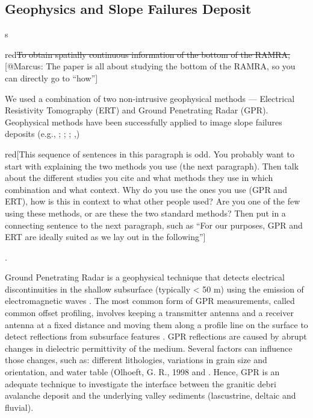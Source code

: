 \documentclass[utf8]{frontiersSCNS}
\newcommand{\alon}{\begin{color}{red}}
\newcommand{\aloff}{\end{color}}
\begin{document}



                 
                 
\subsection{Geophysics and Slope Failures Deposit}s

\alon\sout{To obtain spatially continuous information of the bottom of
  the RAMRA,} [@Marcus: The paper is all about studying the bottom of
  the RAMRA, so you can directly go to ``how''] \aloff We used a
combination of two non-intrusive geophysical methods --- Electrical
Resistivity Tomography (ERT) and Ground Penetrating Radar
(GPR). Geophysical methods have been successfully applied to image
slope failures deposits (e.g., \cite{sass2006determination};
\cite{otto2006comparing}; \cite{socco2010geophysical};
\cite{brody2015near},\cite{liu2018near}) \alon [This sequence of
  sentences in this paragraph is odd. You probably want to start with
  explaining the two methods you use (the next paragraph). Then talk about
  the different studies you cite and what methods they use in which
  combination and what context. Why do you use the ones you use (GPR and ERT), how is this in
  context to what other people used? Are you one of the few using
  these methods, or are these the two standard methods? Then put in a
  connecting sentence to the next paragraph, such as ``For our
  purposes, GPR and ERT are ideally suited as we lay out in the
  following''] \aloff.
                 
Ground Penetrating Radar is a geophysical technique that detects electrical discontinuities in the shallow subsurface (typically < 50 m) using the emission of electromagnetic waves \citep{neal2004ground}. The most common form of GPR measurements, called common offset profiling, involves keeping a transmitter antenna and a receiver antenna at a fixed distance and moving them along a profile line on the surface to detect reflections from subsurface features \citep{jol2008ground}. GPR reflections are caused by abrupt changes in dielectric permittivity of the medium. Several factors can influence those changes, such as: different lithologies, variations in grain size and orientation, and water table (Olhoeft, G. R., 1998 and \citep{neal2004ground}. Hence, GPR is an adequate technique to investigate the interface between the  granitic debri avalanche deposit and the underlying  valley sediments (lascustrine, deltaic and fluvial).   
\end{document}
